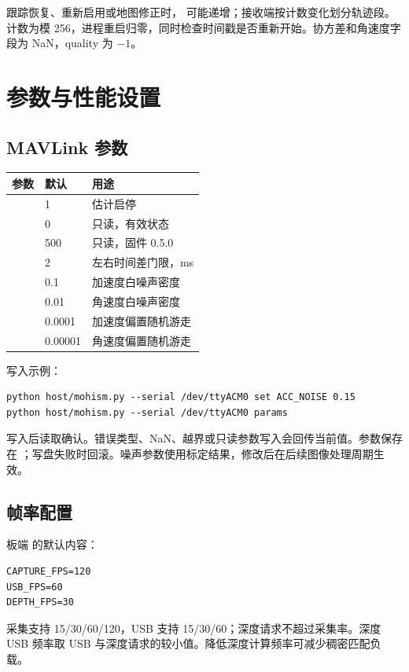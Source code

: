 跟踪恢复、重新启用或地图修正时， 可能递增；接收端按计数变化划分轨迹段。计数为模 256，进程重启归零，同时检查时间戳是否重新开始。协方差和角速度字段为 NaN，quality 为 $-1$。
\newpage
\section{参数与性能设置}
\subsection{MAVLink 参数}
\par\noindent\begin{tabularx}{\linewidth}{@{}p{35mm}p{18mm}Y@{}}\toprule
参数 & 默认 & 用途\\\midrule
{} & 1 & 估计启停\\
 & 0 & 只读，有效状态\\
 & 500 & 只读，固件 0.5.0\\
 & 2 & 左右时间差门限，ms\\
 & 0.1 & 加速度白噪声密度\\
 & 0.01 & 角速度白噪声密度\\
 & 0.0001 & 加速度偏置随机游走\\
 & 0.00001 & 角速度偏置随机游走\\\bottomrule
\end{tabularx}\par
写入示例：
\begin{lstlisting}
python host/mohism.py --serial /dev/ttyACM0 set ACC_NOISE 0.15
python host/mohism.py --serial /dev/ttyACM0 params
\end{lstlisting}
写入后读取确认。错误类型、NaN、越界或只读参数写入会回传当前值。参数保存在 ；写盘失败时回滚。噪声参数使用标定结果，修改后在后续图像处理周期生效。

\subsection{帧率配置}
板端  的默认内容：
\begin{lstlisting}
CAPTURE_FPS=120
USB_FPS=60
DEPTH_FPS=30
\end{lstlisting}
采集支持 15/30/60/120，USB 支持 15/30/60；深度请求不超过采集率。深度 USB 频率取 USB 与深度请求的较小值。降低深度计算频率可减少稠密匹配负载。

